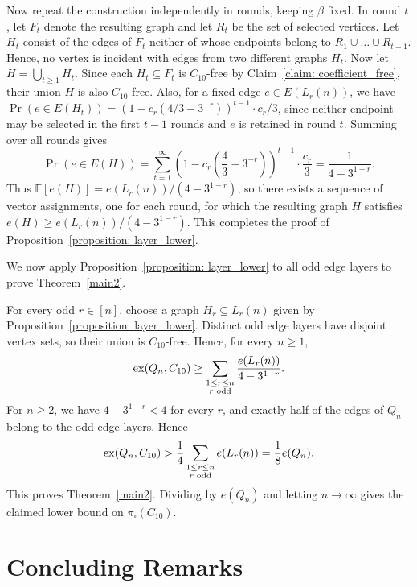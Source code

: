 \documentclass[11pt]{article}
\makeatletter
\theoremstyle{plain}
\theoremstyle{definition}
\renewenvironment{proof}[1][\proofname]
{\par\pushQED{\qed}
	\normalfont\topsep6\p@\@plus6\p@\relax\trivlist
	\item[\hskip\labelsep\bfseries#1\@addpunct{.}]
	\ignorespaces}
{\popQED\endtrivlist\@endpefalse}
\newcommand{\ex}{{\rm ex}}
\makeatother
\begin{document}
\begin{proof}[Proof of Proposition~\ref{proposition: layer_lower}]
Now repeat the construction independently in rounds, keeping $\beta$ fixed. 
In round $t$, let $F_t$ denote the resulting graph and let $R_t$ be the set of selected vertices.
Let $H_t$ consist of the edges of $F_t$ neither of whose endpoints belong to $R_1 \cup \ldots \cup R_{t-1}$.
Hence, no vertex is incident with edges from two different graphs $H_t$. 
Now let $H = \bigcup_{t \geq 1} H_t$. 
Since each $H_t \subseteq F_t$ is $C_{10}$-free by Claim~\ref{claim: coefficient_free}, their union $H$ is also $C_{10}$-free. 
Also, for a fixed edge $e \in E(L_r(n))$, we have $\operatorname{Pr}(e\in E(H_t)) = (1 - c_r(4/3 - 3^{-r}))^{t-1} \cdot c_r/3$, since neither endpoint may be selected in the first $t-1$ rounds and $e$ is retained in round $t$. 
Summing over all rounds gives
\[
    \operatorname{Pr}(e \in E(H)) =\sum_{t=1}^{\infty}
    \left(1-c_r\left(\frac{4}{3} - 3^{-r}\right)\right)^{t-1} \cdot \frac{c_r}{3} = \frac{1}{4-3^{1-r}}.
\]
Thus $\mathbb{E}[e(H)]=e(L_r(n))/(4-3^{1-r})$, so there exists a sequence of vector assignments, one for each round, for which the resulting graph $H$ satisfies $e(H) \geq e(L_r(n))/(4-3^{1-r})$. 
This completes the proof of Proposition~\ref{proposition: layer_lower}.

\end{proof}

We now apply Proposition~\ref{proposition: layer_lower} to all odd edge layers to prove Theorem~\ref{main2}.

\begin{proof}[Proof of Theorem~\ref{main2}]

For every odd $r \in [n]$, choose a graph $H_r \subseteq L_r(n)$ given by Proposition~\ref{proposition: layer_lower}. 
Distinct odd edge layers have disjoint vertex sets, so their union is $C_{10}$-free. 
Hence, for every $n \geq 1$,
\[
    \ex(Q_n,C_{10}) \geq \sum_{\substack{1 \leq r \leq n\\r\text{ odd}}} \frac{e(L_r(n))}{4 - 3^{1-r}}.
\]
For $n \geq 2$, we have $4 - 3^{1-r} < 4$ for every $r$, and exactly half of the edges of $Q_n$ belong to the odd edge layers. 
Hence
\[
    \ex(Q_n,C_{10}) > \frac{1}{4} \sum_{\substack{1 \leq r \leq n\\r\text{ odd}}} e(L_r(n)) = \frac{1}{8}e(Q_n).
\]
This proves Theorem~\ref{main2}. 
Dividing by $e(Q_n)$ and letting $n \rightarrow \infty$ gives the claimed lower bound on $\pi_{\square}(C_{10})$.

\end{proof}

\section{Concluding Remarks}
\end{document}
